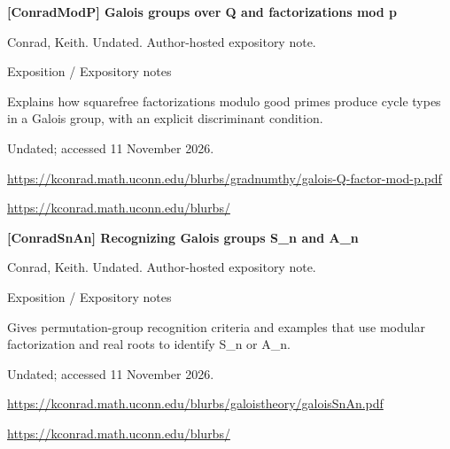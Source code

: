 \documentclass[11pt,a4paper,oneside,openany]{book}
\begin{document}
\vspace{9pt}
\hypertarget{ref:ConradModP}{}
{\sffamily\bfseries\color{atlasgreen}[ConradModP] Galois groups over Q and factorizations mod p}\par
\color{black} Conrad, Keith. Undated. Author-hosted expository note.\par
{\small\sffamily\color{atlasgold}Exposition / Expository notes}\par
\color{black} Explains how squarefree factorizations modulo good primes produce cycle types in a Galois group, with an explicit discriminant condition.\par
{\small Undated; accessed 11 November 2026.}\par
{\footnotesize\url{https://kconrad.math.uconn.edu/blurbs/gradnumthy/galois-Q-factor-mod-p.pdf}}\par
{\footnotesize\url{https://kconrad.math.uconn.edu/blurbs/}}\par
\vspace{9pt}
\hypertarget{ref:ConradSnAn}{}
{\sffamily\bfseries\color{atlasgreen}[ConradSnAn] Recognizing Galois groups S\_\allowbreak{}n and A\_\allowbreak{}n}\par
\color{black} Conrad, Keith. Undated. Author-hosted expository note.\par
{\small\sffamily\color{atlasgold}Exposition / Expository notes}\par
\color{black} Gives permutation-group recognition criteria and examples that use modular factorization and real roots to identify S\_\allowbreak{}n or A\_\allowbreak{}n.\par
{\small Undated; accessed 11 November 2026.}\par
{\footnotesize\url{https://kconrad.math.uconn.edu/blurbs/galoistheory/galoisSnAn.pdf}}\par
{\footnotesize\url{https://kconrad.math.uconn.edu/blurbs/}}\par
\vspace{9pt}
\end{document}
